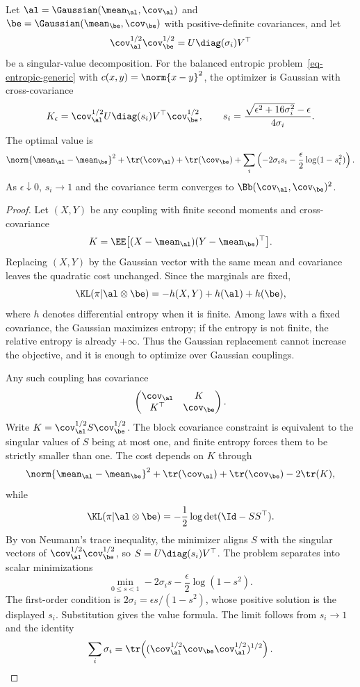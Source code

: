 \begin{prop}\label{prop-gaussian-sinkhorn-closed-form}
	Let $\al=\Gaussian(\mean_\al,\cov_\al)$ and $\be=\Gaussian(\mean_\be,\cov_\be)$ with positive-definite covariances, and let
	\[
		\cov_\al^{1/2}\cov_\be^{1/2}
		=
		U\diag(\sigma_i)V^\top
	\]
	be a singular-value decomposition. For the balanced entropic problem~\eqref{eq-entropic-generic} with $c(x,y)=\norm{x-y}^2$,
	the optimizer is Gaussian with cross-covariance
	\[
		K_\epsilon
		=
		\cov_\al^{1/2}
		U\diag(s_i)V^\top
		\cov_\be^{1/2},
		\qquad
		s_i
		=
		\frac{\sqrt{\epsilon^2+16\sigma_i^2}-\epsilon}{4\sigma_i}.
	\]
	The optimal value is
	\[
		\norm{\mean_\al-\mean_\be}^2
		+
		\tr(\cov_\al)+\tr(\cov_\be)
		+
		\sum_i
		\left(
			-2\sigma_i s_i
			-\frac{\epsilon}{2}\log(1-s_i^2)
		\right).
	\]
	As $\epsilon\downarrow0$, $s_i\to1$ and the covariance term converges to $\Bb(\cov_\al,\cov_\be)^2$.
\end{prop}

\begin{proof}
	Let $(X,Y)$ be any coupling with finite second moments and cross-covariance
	\[
		K=\EE\big[(X-\mean_\al)(Y-\mean_\be)^\top\big].
	\]
	Replacing $(X,Y)$ by the Gaussian vector with the same mean and covariance leaves the quadratic cost unchanged. Since the marginals are fixed,
	\[
		\KL(\pi|\al\otimes\be)
		=
		-h(X,Y)+h(\al)+h(\be),
	\]
	where $h$ denotes differential entropy when it is finite. Among laws with a fixed covariance, the Gaussian maximizes entropy; if the entropy is not finite, the relative entropy is already $+\infty$. Thus the Gaussian replacement cannot increase the objective, and it is enough to optimize over Gaussian couplings.

	Any such coupling has covariance
	\[
		\begin{pmatrix}
			\cov_\al & K\\
			K^\top & \cov_\be
		\end{pmatrix}.
	\]
	Write $K=\cov_\al^{1/2}S\cov_\be^{1/2}$. The block covariance constraint is equivalent to the singular values of $S$ being at most one, and finite entropy forces them to be strictly smaller than one. The cost depends on $K$ through
	\[
		\norm{\mean_\al-\mean_\be}^2+\tr(\cov_\al)+\tr(\cov_\be)-2\tr(K),
	\]
	while
	\[
		\KL(\pi|\al\otimes\be)
		=
		-\frac12\log\det(\Id-SS^\top).
	\]
	By von Neumann's trace inequality, the minimizer aligns $S$ with the singular vectors of $\cov_\al^{1/2}\cov_\be^{1/2}$, so $S=U\diag(s_i)V^\top$. The problem separates into scalar minimizations
	\[
		\min_{0\leq s<1}
		-2\sigma_i s-\frac{\epsilon}{2}\log(1-s^2).
	\]
	The first-order condition is $2\sigma_i=\epsilon s/(1-s^2)$, whose positive solution is the displayed $s_i$. Substitution gives the value formula. The limit follows from $s_i\to1$ and the identity
	\[
		\sum_i\sigma_i
		=
		\tr\!\left((\cov_\al^{1/2}\cov_\be\cov_\al^{1/2})^{1/2}\right).
	\]
\end{proof}

